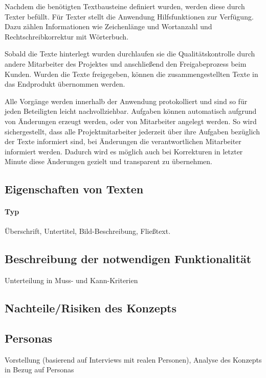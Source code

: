 Nachdem die benötigten Textbausteine definiert wurden, werden diese durch Texter befüllt. Für Texter stellt die Anwendung Hilfsfunktionen zur Verfügung. Dazu zählen Informationen wie Zeichenlänge und Wortanzahl und Rechtschreibkorrektur mit Wörterbuch.

Sobald die Texte hinterlegt wurden durchlaufen sie die Qualitätskontrolle durch andere Mitarbeiter des Projektes und anschließend den Freigabeprozess beim Kunden. Wurden die Texte freigegeben, können die zusammengestellten Texte in das Endprodukt übernommen werden. 

Alle Vorgänge werden innerhalb der Anwendung protokolliert und sind so für jeden Beteiligten leicht nachvollziehbar. Aufgaben können automatisch aufgrund von Änderungen erzeugt werden, oder von Mitarbeiter angelegt werden. So wird sichergestellt, dass alle Projektmitarbeiter jederzeit über ihre Aufgaben bezüglich der Texte informiert sind, bei Änderungen die verantwortlichen Mitarbeiter informiert werden. Dadurch wird es möglich auch bei Korrekturen in letzter Minute diese Änderungen gezielt und transparent zu übernehmen.

\subsection{Eigenschaften von Texten}
\label{l:textattribute}

\paragraph{Typ} Überschrift, Untertitel, Bild-Beschreibung, Fließtext.

\subsection{Beschreibung der notwendigen Funktionalität}

Unterteilung in Muss- und Kann-Kriterien

\subsection{Nachteile/Risiken des Konzepts}

\subsection{Personas}

Vorstellung (basierend auf Interviews mit realen Personen), Analyse des Konzepts in Bezug auf Personas

